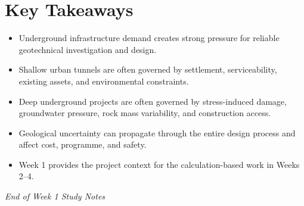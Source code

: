 \documentclass[a4paper,12pt]{article}
\begin{document}
\section{Key Takeaways}
\begin{itemize}
    \item Underground infrastructure demand creates strong pressure for reliable geotechnical investigation and design.
    \item Shallow urban tunnels are often governed by settlement, serviceability, existing assets, and environmental constraints.
    \item Deep underground projects are often governed by stress-induced damage, groundwater pressure, rock mass variability, and construction access.
    \item Geological uncertainty can propagate through the entire design process and affect cost, programme, and safety.
    \item Week 1 provides the project context for the calculation-based work in Weeks 2--4.
\end{itemize}

\vspace{1cm}
\noindent\textit{End of Week 1 Study Notes}
\end{document}
